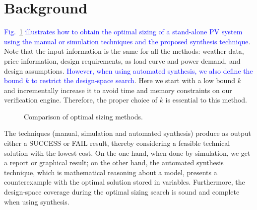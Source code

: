 \documentclass[runningheads]{llncs}
\begin{document}
\vspace{-2ex}

\section{Background}
\label{sec:AutomatedVerification}
\vspace{-1ex}

\textcolor{blue}{Fig.~\ref{fig:optimization} illustrates how to obtain the optimal sizing of a stand-alone PV system using the manual or simulation techniques and the proposed synthesis technique}. Note that the input information is the same for all the methods: weather data, price information, design requirements, as load curve and power demand, and design assumptions. \textcolor{blue}{However, when using automated synthesis, we also define the bound $k$ to restrict the design-space search}. Here we start with a low bound $k$ and incrementally increase it to avoid time and memory constraints on our verification engine. Therefore, the proper choice of $k$ is essential to this method.

\begin{figure}[h]
\centering
\caption{Comparison of optimal sizing methods.}
\label{fig:optimization}
\end{figure}

The techniques (manual, simulation and automated synthesis) produce as output either a SUCCESS or FAIL result, thereby considering a feasible technical solution with the lowest cost. On the one hand, when done by simulation, we get a report or graphical result; on the other hand, the automated synthesis technique, which is mathematical reasoning about a model, presents a counterexample with the optimal solution stored in variables. Furthermore, the design-space coverage during the optimal sizing search is sound and complete when using synthesis.
\end{document}
